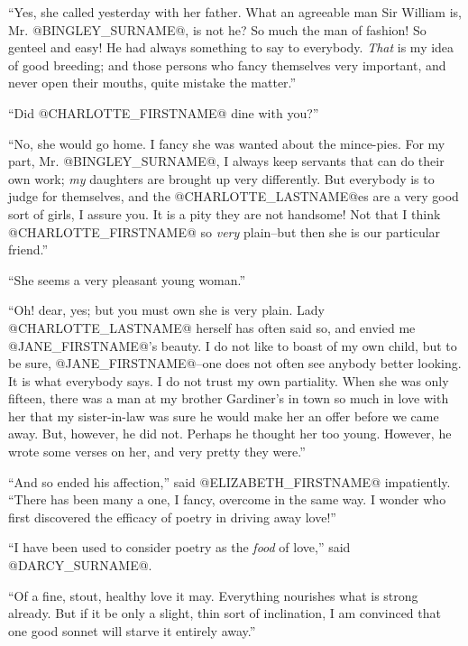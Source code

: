 ``Yes, she called yesterday with her father. What an agreeable man Sir
William is, Mr. @BINGLEY_SURNAME@, is not he? So much the man of fashion! So
genteel and easy! He had always something to say to everybody. \textit{That}
is my idea of good breeding; and those persons who fancy themselves very
important, and never open their mouths, quite mistake the matter.''

``Did @CHARLOTTE_FIRSTNAME@ dine with you?''

``No, she would go home. I fancy she was wanted about the mince-pies. For
my part, Mr. @BINGLEY_SURNAME@, I always keep servants that can do their own work;
\textit{my} daughters are brought up very differently. But everybody is to
judge for themselves, and the @CHARLOTTE_LASTNAME@es are a very good sort of girls,
I assure you. It is a pity they are not handsome! Not that I think
@CHARLOTTE_FIRSTNAME@ so \textit{very} plain--but then she is our particular friend.''

``She seems a very pleasant young woman.''

``Oh! dear, yes; but you must own she is very plain. Lady @CHARLOTTE_LASTNAME@ herself
has often said so, and envied me @JANE_FIRSTNAME@'s beauty. I do not like to boast
of my own child, but to be sure, @JANE_FIRSTNAME@--one does not often see anybody
better looking. It is what everybody says. I do not trust my own
partiality. When she was only fifteen, there was a man at my brother
Gardiner's in town so much in love with her that my sister-in-law was
sure he would make her an offer before we came away. But, however, he
did not. Perhaps he thought her too young. However, he wrote some verses
on her, and very pretty they were.''

``And so ended his affection,'' said @ELIZABETH_FIRSTNAME@ impatiently. ``There has
been many a one, I fancy, overcome in the same way. I wonder who first
discovered the efficacy of poetry in driving away love!''

``I have been used to consider poetry as the \textit{food} of love,'' said @DARCY_SURNAME@.

``Of a fine, stout, healthy love it may. Everything nourishes what is
strong already. But if it be only a slight, thin sort of inclination, I
am convinced that one good sonnet will starve it entirely away.''


